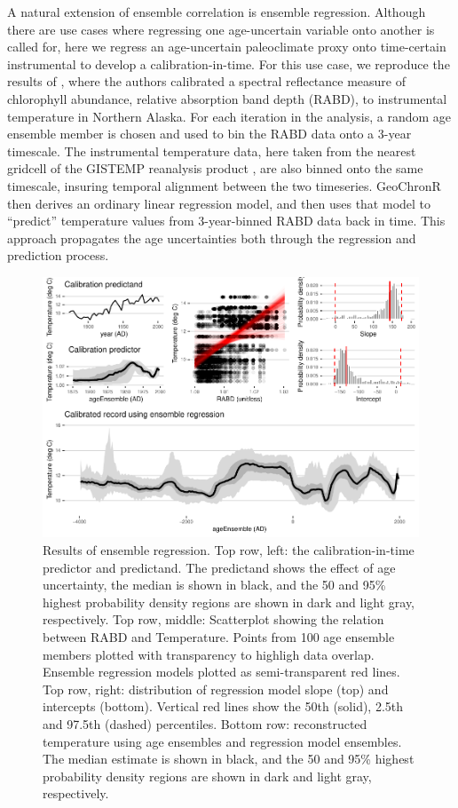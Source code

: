 \documentclass[gchron, manuscript]{copernicus}
\begin{document}
A natural extension of ensemble correlation is ensemble regression.
Although there are use cases where regressing one age-uncertain variable onto another is called for, here we regress an age-uncertain paleoclimate proxy onto time-certain instrumental to develop a calibration-in-time.
For this use case, we reproduce the results of \citet{Boldt2015}, where the authors calibrated a spectral reflectance measure of chlorophyll abundance, relative absorption band depth (RABD), to instrumental temperature in Northern Alaska.
For each iteration in the analysis, a random age ensemble member is chosen and used to bin the RABD data onto a 3-year timescale.
The instrumental temperature data, here taken from the nearest gridcell of the GISTEMP reanalysis product \citep{hansen2010global}, are also binned onto the same timescale, insuring temporal alignment between the two timeseries.
GeoChronR then derives an ordinary linear regression model, and then uses that model to ``predict'' temperature values from 3-year-binned RABD data back in time.
This approach propagates the age uncertainties both through the regression and prediction process.

\begin{figure}
\includegraphics[width=12cm]{geoChronR-paper_files/figure-latex/regression-1} \caption{Results of ensemble regression. Top row, left: the calibration-in-time predictor and predictand. The predictand shows the effect of age uncertainty, the median is shown in black, and the 50 and 95\% highest probability density regions are shown in dark and light gray, respectively. Top row, middle: Scatterplot showing the relation between RABD and Temperature. Points from 100 age ensemble members plotted with transparency to highligh data overlap. Ensemble regression models plotted as semi-transparent red lines. Top row, right: distribution of regression model slope (top) and intercepts (bottom). Vertical red lines show the 50th (solid), 2.5th and 97.5th (dashed) percentiles. Bottom row: reconstructed temperature using age ensembles and regression model ensembles. The median estimate is shown in black, and the 50 and 95\% highest probability density regions are shown in dark and light gray, respectively.}\label{fig:regression}
\end{figure}
\end{document}
